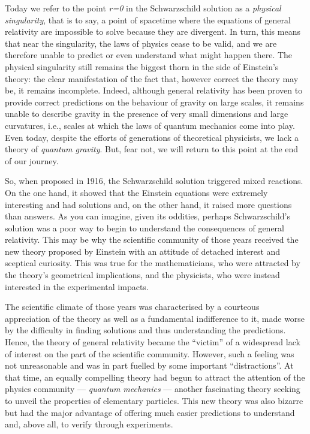 Today we refer to the point \emph{r=0} in the Schwarzschild solution as a \emph{physical
singularity}, that is to say, a point of spacetime where the equations
of general relativity are impossible to solve because they are
divergent. In turn, this means that near the singularity, the laws of physics cease to
be valid, and we are therefore unable to predict or even understand what might happen
there. The physical singularity still remains the biggest thorn in the
side of Einstein's theory: the clear manifestation of the fact that, however correct the
theory may be, it remains incomplete. Indeed, although general relativity has been
proven to provide correct predictions on the behaviour of gravity on large scales, it
remains unable to describe gravity in the presence of very small dimensions and large
curvatures, i.e., scales at which the laws of quantum mechanics come
into play. Even today, despite the efforts of generations of theoretical physicists, we
lack a theory of \emph{quantum gravity}. But, fear not, we will return
to this point at the end of our journey.

So, when proposed in 1916, the Schwarzschild solution triggered mixed reactions. On the
one hand, it showed that the Einstein equations were extremely interesting and had
solutions and, on the other hand, it raised more questions than answers. As you can
imagine, given its oddities, perhaps Schwarzschild's solution was a poor way to begin to
understand the consequences of general relativity. This may be why the
scientific community of those years received the new theory proposed by Einstein with an
attitude of detached interest and sceptical curiosity. This was true for the
mathematicians, who were attracted by the theory's geometrical implications, and the
physicists, who were instead interested in the experimental impacts.

The scientific climate of those years was characterised by a courteous appreciation of
the theory as well as a fundamental indifference to it, made worse by the difficulty in
finding solutions and thus understanding the predictions. Hence, the theory of general
relativity became the ``victim'' of a widespread lack of interest on the part of the
scientific community. However, such a feeling was not unreasonable and was in part
fuelled by some important ``distractions''. At that time, an equally compelling theory
had begun to attract the attention of the physics community --- \emph{quantum
mechanics} --- another fascinating theory seeking to unveil the
properties of elementary particles. This new theory was also bizarre but had the major
advantage of offering much easier predictions to understand and, above all, to verify
through experiments.

